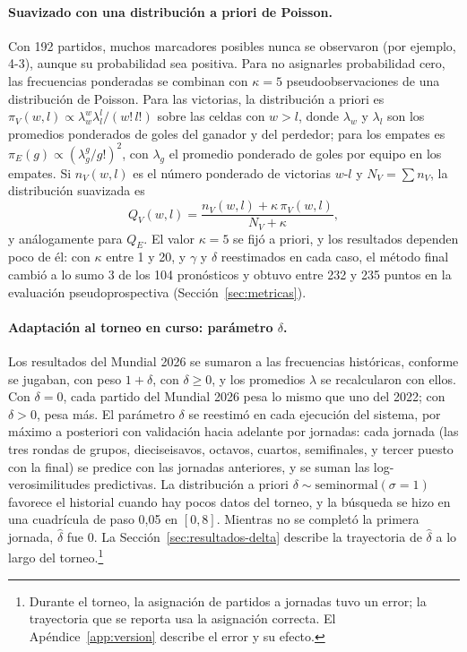 \documentclass[12pt]{article}
\theoremstyle{plain}
\theoremstyle{remark}
\begin{document}
\paragraph{Suavizado con una distribución a priori de Poisson.}
Con 192 partidos, muchos marcadores posibles nunca se observaron
(por ejemplo, 4-3), aunque su probabilidad sea positiva.
Para no asignarles probabilidad cero, las frecuencias ponderadas se
combinan con $\kappa = 5$ pseudoobservaciones de una distribución de
Poisson.
Para las victorias, la distribución a priori es
$\pi_V(w, l) \propto \lambda_w^w \lambda_l^l / (w!\, l!)$ sobre las
celdas con $w > l$, donde $\lambda_w$ y $\lambda_l$ son los promedios
ponderados de goles del ganador y del perdedor; para los empates es
$\pi_E(g) \propto (\lambda_g^g / g!)^2$, con $\lambda_g$ el promedio
ponderado de goles por equipo en los empates.
Si $n_V(w,l)$ es el número ponderado de victorias $w$-$l$ y
$N_V = \sum n_V$, la distribución suavizada es
\begin{equation}
  Q_V(w, l) = \frac{n_V(w, l) + \kappa \, \pi_V(w, l)}{N_V + \kappa},
\end{equation}
y análogamente para $Q_E$.
El valor $\kappa = 5$ se fijó a priori, y los resultados dependen
poco de él: con $\kappa$ entre 1 y 20, y $\gamma$ y $\delta$
reestimados en cada caso, el método final cambió a lo sumo 3 de los
104 pronósticos y obtuvo entre 232 y 235 puntos en la evaluación
pseudoprospectiva (Sección~\ref{sec:metricas}).

\paragraph{Adaptación al torneo en curso: parámetro $\delta$.}
\label{sec:delta}
Los resultados del Mundial 2026 se sumaron a las frecuencias
históricas, conforme se jugaban, con peso $1 + \delta$, con
$\delta \geq 0$, y los promedios $\lambda$ se recalcularon con ellos.
Con $\delta = 0$, cada partido del Mundial 2026 pesa lo mismo que uno
del 2022; con $\delta > 0$, pesa más.
El parámetro $\delta$ se reestimó en cada ejecución del sistema, por
máximo a posteriori con validación hacia adelante por jornadas: cada jornada (las tres rondas de grupos,
dieciseisavos, octavos, cuartos, semifinales, y tercer puesto con la
final) se predice con las jornadas anteriores, y se suman las
log-verosimilitudes predictivas.
La distribución a priori $\delta \sim \text{seminormal}(\sigma = 1)$
favorece el historial cuando hay pocos datos del torneo, y la búsqueda
se hizo en una cuadrícula de paso 0,05 en $[0, 8]$.
Mientras no se completó la primera jornada, $\hat\delta$ fue 0.
La Sección~\ref{sec:resultados-delta} describe la trayectoria de
$\hat\delta$ a lo largo del torneo.\footnote{Durante el torneo, la
asignación de partidos a jornadas tuvo un error; la trayectoria que
se reporta usa la asignación correcta. El
Apéndice~\ref{app:version} describe el error y su efecto.}
\end{document}
